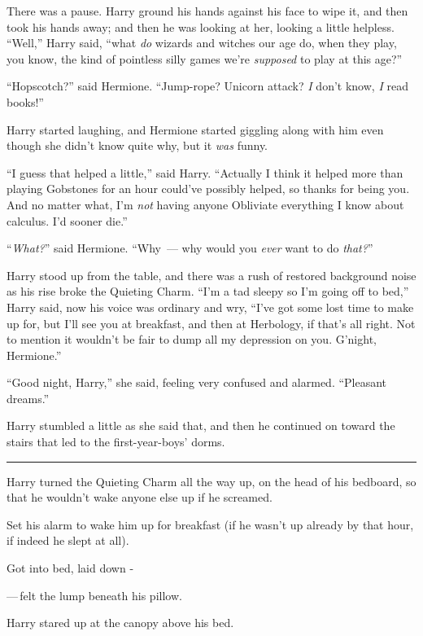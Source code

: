 There was a pause. Harry ground his hands against his face to wipe it, and then took his hands away; and then he was looking at her, looking a little helpless. ``Well,'' Harry said, ``what \emph{do} wizards and witches our age do, when they play, you know, the kind of pointless silly games we're \emph{supposed} to play at this age?''

``Hopscotch?'' said Hermione. ``Jump-rope? Unicorn attack? \emph{I} don't know, \emph{I} read books!''

Harry started laughing, and Hermione started giggling along with him even though she didn't know quite why, but it \emph{was} funny.

``I guess that helped a little,'' said Harry. ``Actually I think it helped more than playing Gobstones for an hour could've possibly helped, so thanks for being you. And no matter what, I'm \emph{not} having anyone Obliviate everything I know about calculus. I'd sooner die.''

``\emph{What?}'' said Hermione. ``Why~--- why would you \emph{ever} want to do \emph{that?}''

Harry stood up from the table, and there was a rush of restored background noise as his rise broke the Quieting Charm. ``I'm a tad sleepy so I'm going off to bed,'' Harry said, now his voice was ordinary and wry, ``I've got some lost time to make up for, but I'll see you at breakfast, and then at Herbology, if that's all right. Not to mention it wouldn't be fair to dump all my depression on you. G'night, Hermione.''

``Good night, Harry,'' she said, feeling very confused and alarmed. ``Pleasant dreams.''

Harry stumbled a little as she said that, and then he continued on toward the stairs that led to the first-year-boys' dorms.

\begin{center}\rule{3in}{0.4pt}\end{center}

Harry turned the Quieting Charm all the way up, on the head of his bedboard, so that he wouldn't wake anyone else up if he screamed.

Set his alarm to wake him up for breakfast (if he wasn't up already by that hour, if indeed he slept at all).

Got into bed, laid down -

---\,felt the lump beneath his pillow.

Harry stared up at the canopy above his bed.

